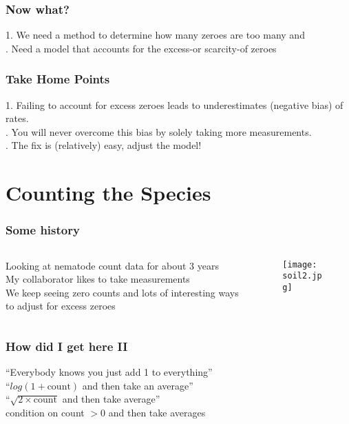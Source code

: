 \documentclass{beamer} %
\theoremstyle{definition} %
\begin{document}
\begin{frame} 
\frametitle{Now what? }
1. We need a method to determine how many zeroes are too many and \\
\vspace{1in}
. Need a model that accounts for the excess-or scarcity-of zeroes
\end{frame}

\begin{frame}
\frametitle{Take Home Points}
1. Failing to account for excess zeroes  leads to underestimates (negative bias) of rates. \\
. You will never overcome this bias by solely taking more measurements. \\
. The fix is (relatively) easy, adjust the model! \\
\end{frame}

\section{Counting the Species} 

\begin{frame} 
\frametitle{Some history}

\begin{columns} %
\begin{column}{0.5\textwidth} %
Looking at nematode count data for about 3 years\\
\pause
My collaborator likes to take measurements \\
\pause
We keep seeing zero counts and lots of interesting ways to adjust for excess zeroes\\
\end{column}
\begin{column}{0.5\textwidth} %
\begin{figure}[htb]
\texttt{[image: soil2.jpg]}
\end{figure}
\end{column}
\end{columns}
\end{frame}

\begin{frame} 
\frametitle{How did I get here II}
``Everybody knows you just add 1 to everything''\\ 
\pause
\vspace{0.5in}
``$log(1+\text{count})$ and then take an average''\\
\pause
\vspace{0.5in}
``$\sqrt{2\times \text{count}}$ and then take average''\\
\pause 
\vspace{0.5in}
condition on count $>0$ and then take averages\\
\end{frame}
\end{document}
